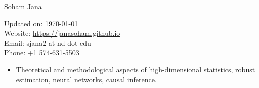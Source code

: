 \documentclass[letterpaper,12pt,oneside]{article}
\theoremstyle{definition}
\begin{document}
			
			
			\noindent  \Huge{Soham Jana} \\
			\vspace{1ex} 
			\normalsize
			
			\hfill
			\begin{minipage}{2.7in}
				Updated on: \today\\
				Website: \href{https://janasoham.github.io/}{https://janasoham.github.io}\\
				Email: {sjana2-at-nd-dot-edu}\\
				Phone: +1 574-631-5503
			\end{minipage}
			\vspace{0.8cm}
			
			
			
			
			
			
			\begin{itemize}
				\item[] Theoretical and methodological aspects of high-dimensional statistics, robust estimation, neural networks, causal inference.
			\end{itemize}
			
			
\end{document}
